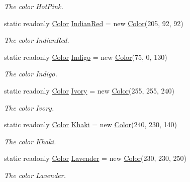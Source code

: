 \begin{DoxyCompactItemize}
\begin{DoxyCompactList}\small\item\em The color Hot\-Pink. \end{DoxyCompactList}\item 
static readonly \hyperlink{struct_tri_devs_1_1_tri_engine_1_1_color}{Color} \hyperlink{struct_tri_devs_1_1_tri_engine_1_1_color_a2586296ff22894fb6a951971d39b3a32}{Indian\-Red} = new \hyperlink{struct_tri_devs_1_1_tri_engine_1_1_color}{Color}(205, 92, 92)
\begin{DoxyCompactList}\small\item\em The color Indian\-Red. \end{DoxyCompactList}\item 
static readonly \hyperlink{struct_tri_devs_1_1_tri_engine_1_1_color}{Color} \hyperlink{struct_tri_devs_1_1_tri_engine_1_1_color_aeac25872ec8d6d49c01f12d48cb8f3e1}{Indigo} = new \hyperlink{struct_tri_devs_1_1_tri_engine_1_1_color}{Color}(75, 0, 130)
\begin{DoxyCompactList}\small\item\em The color Indigo. \end{DoxyCompactList}\item 
static readonly \hyperlink{struct_tri_devs_1_1_tri_engine_1_1_color}{Color} \hyperlink{struct_tri_devs_1_1_tri_engine_1_1_color_ab7cdf8e73d567c3d8224810300250c02}{Ivory} = new \hyperlink{struct_tri_devs_1_1_tri_engine_1_1_color}{Color}(255, 255, 240)
\begin{DoxyCompactList}\small\item\em The color Ivory. \end{DoxyCompactList}\item 
static readonly \hyperlink{struct_tri_devs_1_1_tri_engine_1_1_color}{Color} \hyperlink{struct_tri_devs_1_1_tri_engine_1_1_color_ad44242004fcbc5effbded130d0fb9247}{Khaki} = new \hyperlink{struct_tri_devs_1_1_tri_engine_1_1_color}{Color}(240, 230, 140)
\begin{DoxyCompactList}\small\item\em The color Khaki. \end{DoxyCompactList}\item 
static readonly \hyperlink{struct_tri_devs_1_1_tri_engine_1_1_color}{Color} \hyperlink{struct_tri_devs_1_1_tri_engine_1_1_color_a8afe354a85ec0fd3e5a5dfe29c4df610}{Lavender} = new \hyperlink{struct_tri_devs_1_1_tri_engine_1_1_color}{Color}(230, 230, 250)
\begin{DoxyCompactList}\small\item\em The color Lavender. \end{DoxyCompactList}\item 

\end{DoxyCompactItemize}
